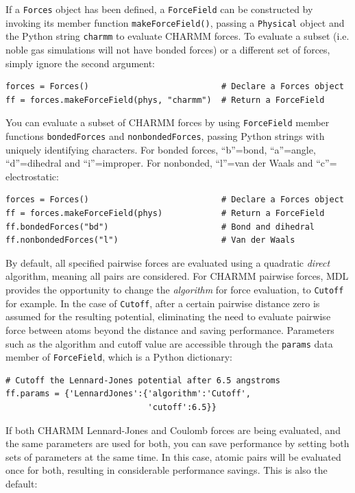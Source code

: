\documentclass[11pt]{report}
\begin{document}
If a \texttt{Forces} object has been defined, a \texttt{ForceField}
can be constructed by invoking its member function \texttt{makeForceField()},
passing a \texttt{Physical} object and the Python string \texttt{charmm}
to evaluate CHARMM forces.  To evaluate a subset (i.e. noble gas simulations
will not have bonded forces) or a different set of
forces, simply ignore the second argument:

\begin{verbatim}
forces = Forces()                           # Declare a Forces object
ff = forces.makeForceField(phys, "charmm")  # Return a ForceField
\end{verbatim}

You can evaluate a subset of CHARMM forces by using \texttt{ForceField}
member functions \texttt{bondedForces} and \texttt{nonbondedForces},
passing Python strings with uniquely identifying characters.
For bonded forces, ``b''=bond, ``a''=angle, ``d''=dihedral
and ``i''=improper.  For nonbonded, ``l''=van der Waals
and ``c''= electrostatic:

\begin{verbatim}
forces = Forces()                           # Declare a Forces object
ff = forces.makeForceField(phys)            # Return a ForceField
ff.bondedForces("bd")                       # Bond and dihedral
ff.nonbondedForces("l")                     # Van der Waals
\end{verbatim}

By default, all specified pairwise forces are evaluated
using a quadratic {\it direct} algorithm, meaning all pairs are
considered.  For CHARMM pairwise forces, MDL provides the opportunity to
change the {\it algorithm} for force evaluation, to \texttt{Cutoff}
for example.  In the case of \texttt{Cutoff}, after a certain
pairwise distance zero is assumed for the resulting potential, 
eliminating the need to evaluate pairwise force between atoms beyond
the distance and saving performance.  Parameters such as the algorithm
and cutoff value are accessible through the \texttt{params} data
member of \texttt{ForceField}, which is a Python dictionary:

\begin{verbatim}
# Cutoff the Lennard-Jones potential after 6.5 angstroms
ff.params = {'LennardJones':{'algorithm':'Cutoff',
                             'cutoff':6.5}}
\end{verbatim}

If both CHARMM Lennard-Jones and Coulomb forces are being evaluated,
and the same parameters are used for both, you can save performance
by setting both sets of parameters at the same time. In this case,
atomic pairs will be evaluated once for both, resulting in considerable
performance savings.  This is also the default:
\end{document}
